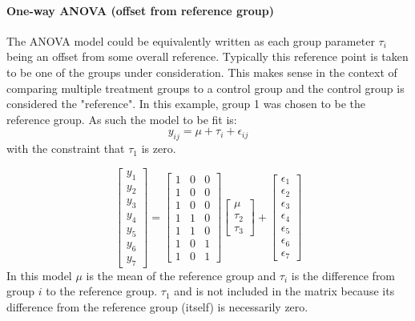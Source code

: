 \paragraph{One-way ANOVA (offset from reference group)}
The ANOVA model could be equivalently written as each group parameter $\tau_i$ being an offset from some overall reference.  Typically this reference point is taken to be one of the groups under consideration. This makes sense in the context of comparing multiple treatment groups to a control group and the control group is considered the "reference". In this example, group 1 was chosen to be the reference group. As such the model to be fit is:
\begin{equation}
  y_{ij} = \mu + \tau_i + \epsilon_{ij}
\end{equation}
with the constraint that $\tau_1$ is zero.

\begin{equation}
  \begin{bmatrix}y_1 \\ y_2 \\ y_3 \\ y_4 \\ y_5 \\ y_6 \\ y_7 \end{bmatrix} =
  \begin{bmatrix}1 &0 &0 \\1 &0  &0 \\ 1 & 0 & 0 \\ 1 & 1 & 0 \\ 1 & 1 & 0 \\ 1 & 0 & 1 \\ 1  & 0 & 1\end{bmatrix}
  \begin{bmatrix}\mu \\  \tau_2 \\ \tau_3 \end{bmatrix}
  +
  \begin{bmatrix} \epsilon_1 \\ \epsilon_2 \\ \epsilon_3 \\ \epsilon_4 \\ \epsilon_5 \\ \epsilon_6 \\ \epsilon_7 \end{bmatrix}
\end{equation}
In this model $\mu$ is the mean of the reference group and $\tau_i$ is the difference from group $i$ to the reference group. $\tau_1$ and is not included in the matrix because its difference from the reference group (itself) is necessarily zero.
